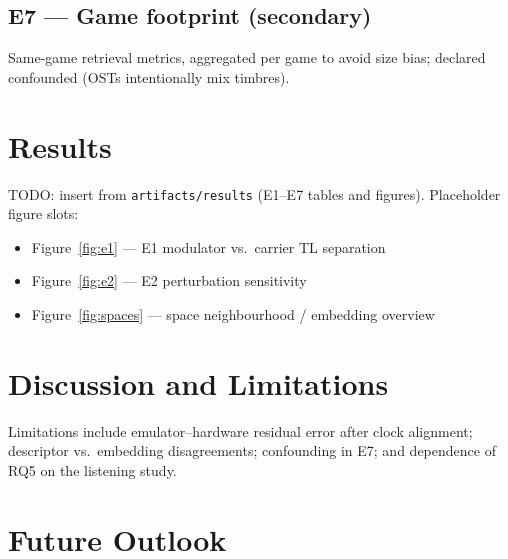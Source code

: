 \documentclass{article}
\begin{document}
\subsection{E7 --- Game footprint (secondary)}
\label{sec:e7}
Same-game retrieval metrics, aggregated per game to avoid size bias; declared
confounded (OSTs intentionally mix timbres).

\section{Results}
\label{sec:results}

TODO: insert from \texttt{artifacts/results} (E1--E7 tables and figures).
Placeholder figure slots:

\begin{itemize}
  \item Figure~\ref{fig:e1} --- E1 modulator vs.\ carrier TL separation
  \item Figure~\ref{fig:e2} --- E2 perturbation sensitivity
  \item Figure~\ref{fig:spaces} --- space neighbourhood / embedding overview
\end{itemize}


\section{Discussion and Limitations}
\label{sec:discussion}

Limitations include emulator--hardware residual error after clock alignment;
descriptor vs.\ embedding disagreements; confounding in E7; and dependence of
RQ5 on the listening study.

\section{Future Outlook}
\label{sec:outlook}
\end{document}
